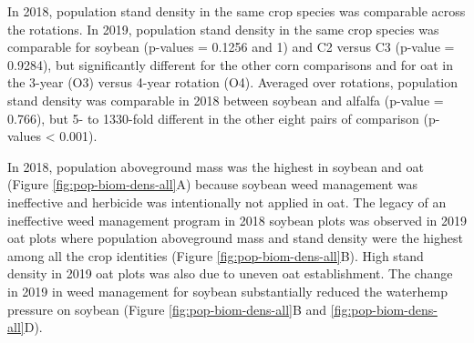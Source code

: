 \documentclass[
]{article}
\begin{document}
In 2018, population stand density in the same crop species was comparable across the rotations. In 2019, population stand density in the same crop species was comparable for soybean (p-values = 0.1256 and 1) and C2 versus C3 (p-value = 0.9284), but significantly different for the other corn comparisons and for oat in the 3-year (O3) versus 4-year rotation (O4). Averaged over rotations, population stand density was comparable in 2018 between soybean and alfalfa (p-value = 0.766), but 5- to 1330-fold different in the other eight pairs of comparison (p-values \textless{} 0.001).

In 2018, population aboveground mass was the highest in soybean and oat (Figure \ref{fig:pop-biom-dens-all}A) because soybean weed management was ineffective and herbicide was intentionally not applied in oat. The legacy of an ineffective weed management program in 2018 soybean plots was observed in 2019 oat plots where population aboveground mass and stand density were the highest among all the crop identities (Figure \ref{fig:pop-biom-dens-all}B). High stand density in 2019 oat plots was also due to uneven oat establishment. The change in 2019 in weed management for soybean substantially reduced the waterhemp pressure on soybean (Figure \ref{fig:pop-biom-dens-all}B and \ref{fig:pop-biom-dens-all}D).
\end{document}
